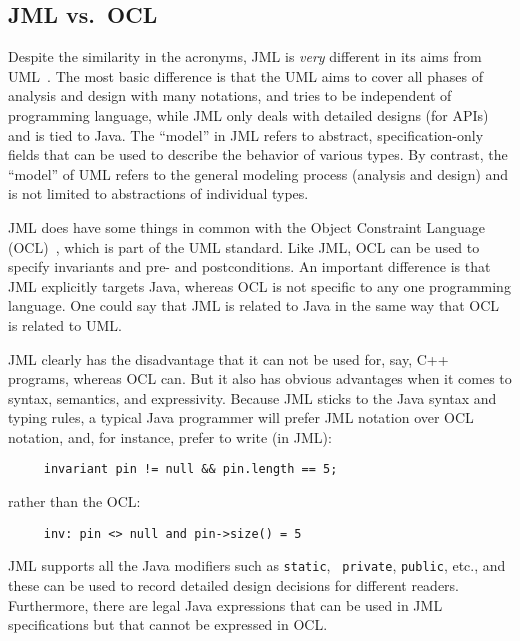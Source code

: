 \subsection{JML vs.\ OCL}
\label{related}

Despite the similarity in the acronyms, JML is {\em very} different in
its aims from UML~\cite{RumbaughJacobsonBooch98}.
The most basic difference is that the UML aims to cover all phases of
analysis and design with many notations, and tries to be independent
of programming language, while JML only deals with detailed designs
(for APIs) and is tied to Java.  The ``model'' in
JML refers to abstract, specification-only fields that can be used to
describe the behavior of various types.  By contrast, the ``model'' of
UML refers to the general modeling process (analysis and design) and
is not limited to abstractions of individual types.

JML does have some things in common with the Object Constraint
Language (OCL)~\cite{WarmerKleppe99}, which is part of the UML
standard.  Like JML, OCL can be used to specify invariants and pre-
and postconditions.  An important difference is that JML explicitly
targets Java, whereas OCL is not specific to any one programming
language.  One could say that JML is related to Java in the same way
that OCL is related to UML\@.

JML clearly has the disadvantage that it can not be used for, say, C++
programs, whereas OCL can.  But it also has obvious advantages when it
comes to syntax, semantics, and expressivity.  Because JML sticks to
the Java syntax and typing rules, a typical Java programmer will
prefer JML notation over OCL notation, and, for instance, prefer to
write (in JML):
\begin{verbatim}
     invariant pin != null && pin.length == 5;
\end{verbatim}
rather than the OCL:
\begin{verbatim}
     inv: pin <> null and pin->size() = 5
\end{verbatim}

JML supports all the Java modifiers such as {\tt static}, {\tt
  private}, {\tt public}, etc., and these can be used to record
detailed design decisions for different readers.
Furthermore, there are legal Java
expressions that can be used in JML specifications but that cannot be
expressed in OCL\@.

